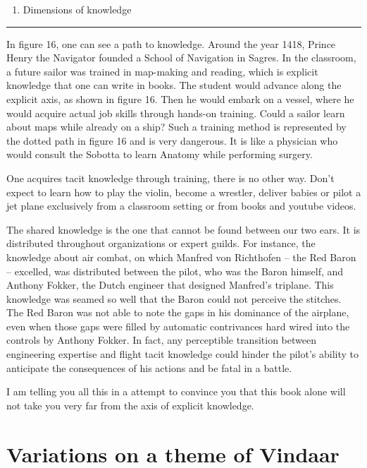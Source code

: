 \documentclass[
  12pt,
]{book}
\providecommand{\tightlist}{%
  \setlength{\itemsep}{0pt}\setlength{\parskip}{0pt}}
\begin{document}
\begin{enumerate}
\def\labelenumi{(\arabic{enumi})}
\setcounter{enumi}{15}
\tightlist
\item
  Dimensions of knowledge
\end{enumerate}

\begin{center}\rule{0.5\linewidth}{0.5pt}\end{center}

In figure 16, one can see a path to knowledge. Around the year 1418,
Prince Henry the Navigator founded a School of Navigation in Sagres. In
the classroom, a future sailor was trained in map-making and reading,
which is explicit knowledge that one can write in books. The student
would advance along the explicit axis, as shown in figure 16. Then he
would embark on a vessel, where he would acquire actual job skills
through hands-on training. Could a sailor learn about maps while already
on a ship? Such a training method is represented by the dotted path in
figure 16 and is very dangerous. It is like a physician who would
consult the Sobotta to learn Anatomy while performing surgery.

One acquires tacit knowledge through training, there is no other way.
Don't expect to learn how to play the violin, become a wrestler, deliver
babies or pilot a jet plane exclusively from a classroom setting or from
books and youtube videos.

The shared knowledge is the one that cannot be found between our two
ears. It is distributed throughout organizations or expert guilds. For
instance, the knowledge about air combat, on which Manfred von
Richthofen -- the Red Baron -- excelled, was distributed between the
pilot, who was the Baron himself, and Anthony Fokker, the Dutch engineer
that designed Manfred's triplane. This knowledge was seamed so well that
the Baron could not perceive the stitches. The Red Baron was not able to
note the gaps in his dominance of the airplane, even when those gaps
were filled by automatic contrivances hard wired into the controls by
Anthony Fokker. In fact, any perceptible transition between engineering
expertise and flight tacit knowledge could hinder the pilot's ability to
anticipate the consequences of his actions and be fatal in a battle.

I am telling you all this in a attempt to convince you that this book
alone will not take you very far from the axis of explicit knowledge.

\chapter{Variations on a theme of
Vindaar}\label{variations-on-a-theme-of-vindaar}
\end{document}
